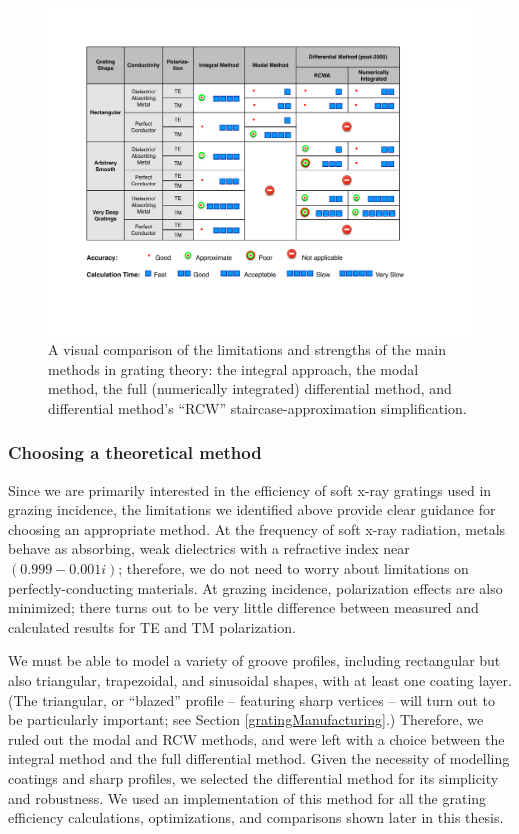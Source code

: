 \begin{figure}[htbp] %
   \centering
   \includegraphics[scale=0.8]{../data/Chapter2/2e_methodComparision/methodComparisonTable_noPre2000.pdf} 
   \caption{A visual comparison of the limitations and strengths of the main methods in grating theory: the integral approach, the modal method, the full (numerically integrated) differential method, and differential method's ``RCW'' staircase-approximation simplification.}
   \label{2e}
\end{figure}


\subsubsection{Choosing a theoretical method}
Since we are primarily interested in the efficiency of soft x-ray gratings used in grazing incidence, the limitations we identified above provide clear guidance for choosing an appropriate method.  At the frequency of soft x-ray radiation, metals behave as absorbing, weak dielectrics with a refractive index near $(0.999 - 0.001i)$; therefore, we do not need to worry about limitations on perfectly-conducting materials.  At grazing incidence, polarization effects are also minimized; there turns out to be very little difference between measured and calculated results for TE and TM polarization.

We must be able to model a variety of groove profiles, including rectangular but also triangular, trapezoidal, and sinusoidal shapes, with at least one coating layer.  (The triangular, or ``blazed'' profile -- featuring sharp vertices -- will turn out to be particularly important; see Section \ref{gratingManufacturing}.)  Therefore, we ruled out the modal and RCW methods, and were left with a choice between the integral method and the full differential method.    Given the necessity of modelling coatings and sharp profiles, we selected the differential method for its simplicity and robustness.  We used an implementation of this method for all the grating efficiency calculations, optimizations, and comparisons shown later in this thesis.

